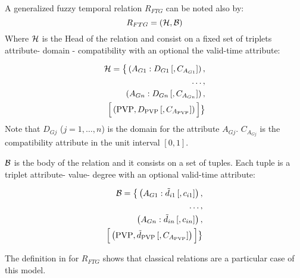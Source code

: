 \begin{definition}
% 
% 
% 
% 
 A generalized fuzzy temporal relation $R_{FTG}$ can be noted also by:
\label{def:generalized-fuzzy-temporal-relation}
\begin{equation}
\label{eq:generalized-fuzzy-temporal-relation}
R_{FTG} = \left(\mathcal{H}, \mathcal{B} \right)
\end{equation}
Where $\mathcal{H}$ is the Head of the relation and consist on a fixed set of triplets attribute- domain - compatibility with an optional the valid-time attribute:

\begin{align}
\label{eq:head-valid-time}
\mathcal{H} = \big \lbrace \left(A_{G1}:D_{G1}\left[,C_{A_{G1}} \right] \right),\\
\nonumber
 \ldots,\\
 \nonumber
  \left(A_{Gn}:D_{Gn}\left[,C_{A_{Gn}} \right] \right),\\
  \nonumber
  \Big[  \left( \text{PVP}, D_{\text{PVP}}\left[,C_{A_{\text{PVP}}} \right] \right) \Big] \big \rbrace
\end{align}
Note that $D_{Gj}$ ($j = 1, \ldots, n$) is the domain for the attribute $A_{Gj}$. $C_{A_{Gj}}$ is the compatibility attribute in the unit interval $\left[0, 1 \right]$.

$\mathcal{B}$ is the body of the relation and it consists on a set of tuples. Each tuple is a triplet attribute- value- degree with an optional valid-time attribute:

\begin{align}
\label{eq:body-valid-time}
\mathcal{B} = \big \lbrace \left(A_{G1}:\tilde{d}_{i1}\left[,c_{i1} \right] \right),\\
\nonumber
 \ldots,\\
 \nonumber
  \left(A_{Gn}:\tilde{d}_{in}\left[,c_{in} \right] \right),\\
  \nonumber
   \Big[  \left( \text{PVP}, \tilde{d}_{\text{PVP}} \left[,C_{A_{\text{PVP}}} \right] \right)  \Big] \big \rbrace
\end{align}

\end{definition}


The definition in \cite{Medina1994} for $R_{FTG}$ shows that classical relations are a particular case of this model. 
